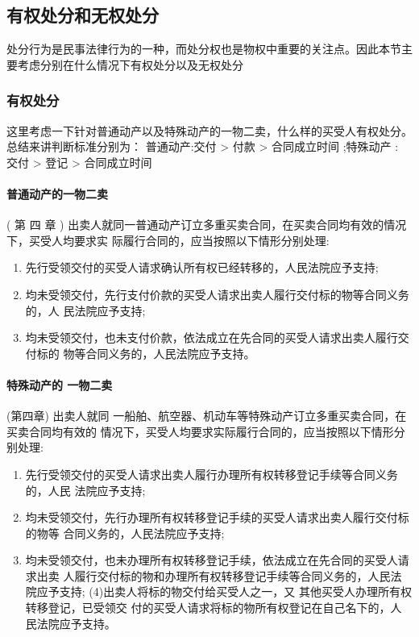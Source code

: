 \documentclass[UTF8,12pt]{ctexart}
\numberwithin{equation}{section} %
\numberwithin{figure}{section}
\numberwithin{table}{section}
\begin{document}
	\subsection{有权处分和无权处分}
	处分行为是民事法律行为的一种，而处分权也是物权中重要的关注点。因此本节主要考虑分别在什么情况下有权处分以及无权处分
	
	\subsubsection{有权处分}
	这里考虑一下针对普通动产以及特殊动产的一物二卖，什么样的买受人有权处分。总结来讲判断标准分别为： 普通动产:交付 > 付款 > 合同成立时间 ;特殊动产 : 交付 > 登记 > 合同成立时间
	
	\paragraph{普通动产的一物二卖} ( 第 四 章 ) 
	出卖人就同一普通动产订立多重买卖合同，在买卖合同均有效的情况下，买受人均要求实 际履行合同的，应当按照以下情形分别处理: 
	\begin{enumerate}
		\item 先行受领交付的买受人请求确认所有权已经转移的，人民法院应予支持;
		
		\item 均未受领交付，先行支付价款的买受人请求出卖人履行交付标的物等合同义务的，人 民法院应予支持;
		
		\item 均未受领交付，也未支付价款，依法成立在先合同的买受人请求出卖人履行交付标的 物等合同义务的，人民法院应予支持。
	\end{enumerate}
	
	\paragraph{特殊动产的 一物二卖}(第四章)
	出卖人就同 一船舶、航空器、机动车等特殊动产订立多重买卖合同，在买卖合同均有效的 情况下，买受人均要求实际履行合同的，应当按照以下情形分别处理: 
	\begin{enumerate}
		\item 先行受领交付的买受人请求出卖人履行办理所有权转移登记手续等合同义务的，人民 法院应予支持;
		
		\item 均未受领交付，先行办理所有权转移登记手续的买受人请求出卖人履行交付标的物等 合同义务的，人民法院应予支持;
		
		\item 均未受领交付，也未办理所有权转移登记手续，依法成立在先合同的买受人请求出卖 人履行交付标的物和办理所有权转移登记手续等合同义务的，人民法院应予支持; (4)出卖人将标的物交付给买受人之一，又 其他买受人办理所有权转移登记，已受领交 付的买受人请求将标的物所有权登记在自己名下的，人民法院应予支持。
	\end{enumerate}
	
\end{document}
